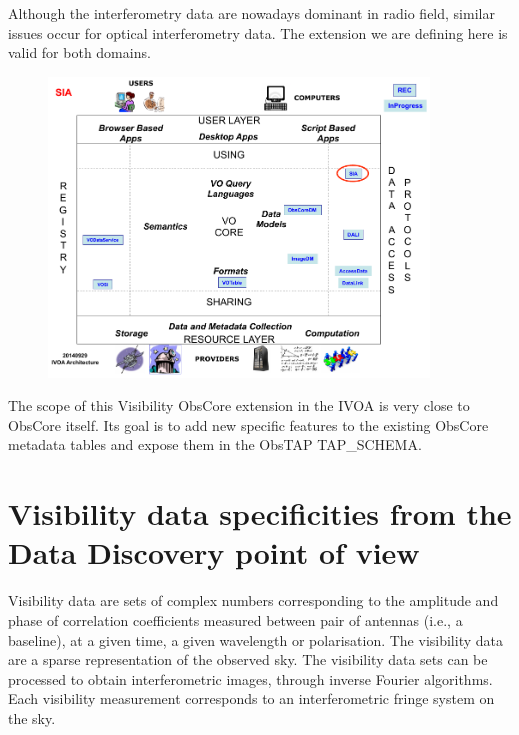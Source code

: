 \documentclass[11pt,a4paper]{ivoa}
\begin{document}
Although the interferometry data are nowadays dominant in radio field, similar issues occur for 
optical interferometry data. The extension we are defining here is valid for both domains.  


\begin{figure}[H]
\centering

\includegraphics[width=0.9\textwidth]{archdiag.png}
\label{fig:architecture}
\end{figure}


The scope of this Visibility ObsCore extension in the IVOA is very close to ObsCore itself. 
Its goal is to add new specific features to the existing ObsCore metadata tables and expose 
them in the ObsTAP TAP\_SCHEMA. 

\section{Visibility data specificities from the Data Discovery point of view}
\label{sec:specificities}

Visibility data are sets of complex numbers corresponding to the amplitude and phase 
of correlation coefficients measured between pair of antennas (i.e., a baseline), at 
a given time, a given wavelength or polarisation. The visibility data are a sparse 
representation of the observed sky. The visibility data sets can be processed to obtain 
interferometric images, through inverse Fourier algorithms. Each visibility measurement 
corresponds to an interferometric fringe system on the sky. 
\end{document}
